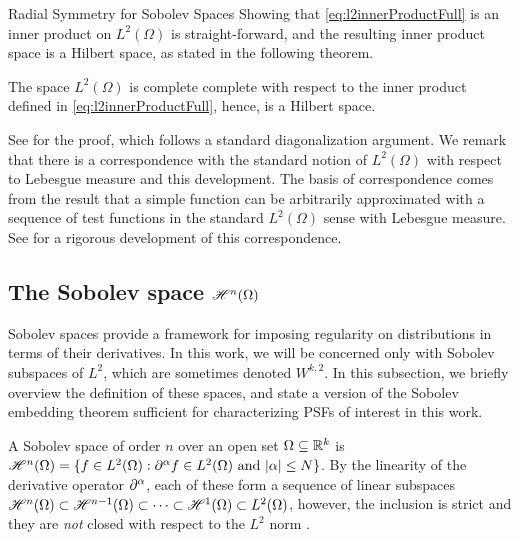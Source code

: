 \begin{chapter}{Radial Symmetry for Sobolev Spaces}
Showing that \eqref{eq:l2innerProductFull} is an inner product on $L^2(\Omega)$ is straight-forward, and the resulting inner product space is a Hilbert space, as stated in the following theorem.
\begin{thm}
The space $L^2(\Omega)$ is complete complete with respect to the inner product defined in \eqref{eq:l2innerProductFull}, hence, is a Hilbert space.
\end{thm}
See \citep{richtmyer1978principles} for the proof, which follows a standard diagonalization argument. %
We remark that there is a correspondence with the standard notion of $L^2(\Omega)$ with respect to Lebesgue measure and this development.
The basis of correspondence comes from the result that a simple function can be arbitrarily approximated with a sequence of test functions in the standard $L^2(\Omega)$ sense with Lebesgue measure. 
See \citep{hormander1983} for a rigorous development of this correspondence.
\subsection{The Sobolev space $\mathscr H^n(\Omega)$}
Sobolev spaces provide a framework for imposing regularity on distributions in terms of their derivatives.
In this work, we will be concerned only with Sobolev subspaces of $L^2$, which are sometimes denoted $W^{k,2}$.
In this subsection, we briefly overview the definition of these spaces, and state a version of the Sobolev embedding theorem sufficient for characterizing PSFs of interest in this work.

A Sobolev space of order $n$ over an open set $\Omega \subseteq \mathbb R^k$ is $\mathscr H^n(\Omega) = \{f \in L^2(\Omega): \partial^\alpha f \in L^2(\Omega)\text{ and }|\alpha|\le N\}$.
By the linearity of the derivative operator $\partial^\alpha$, each of these form a sequence of linear subspaces $\mathscr H^n(\Omega) \subset \mathscr H^{n-1}(\Omega) \subset \dots \subset \mathscr H^1(\Omega) \subset L^2(\Omega)$, however, the inclusion is strict and they are \emph{not} closed with respect to the $L^2$ norm \citep{richtmyer1978principles}.


\end{chapter}
